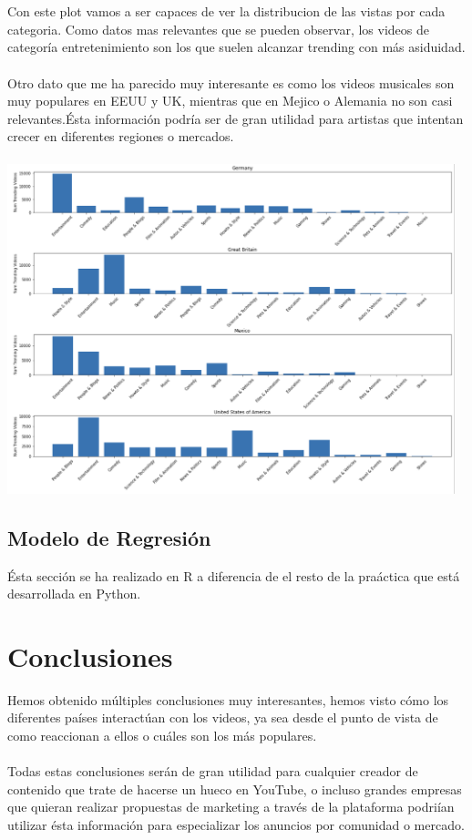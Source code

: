\documentclass[a4paper,12pt]{article}
\begin{document}
\\
\\
Con este plot vamos a ser capaces de ver la distribucion de las vistas por cada categoria. Como datos mas relevantes que se pueden observar, los videos de categor\'ia entretenimiento son los que suelen alcanzar trending con m\'as asiduidad.
\\
\\
Otro dato que me ha parecido muy interesante es como los videos musicales son muy populares en EEUU y UK, mientras que en Mejico o Alemania no son casi relevantes.\'Esta informaci\'on podr\'ia ser de gran utilidad para artistas que intentan crecer en diferentes regiones o mercados.
\\
\\
\includegraphics[width=13cm]{plot_categories.png}

\subsection{Modelo de Regresi\'on}
\'Esta secci\'on se ha realizado en R a diferencia de el resto de la pra\'actica que est\'a desarrollada en Python.



\section[item_conclusiones]{Conclusiones}
Hemos obtenido m\'ultiples conclusiones muy interesantes, hemos visto c\'omo los diferentes pa\'ises interact\'uan con los videos, ya sea desde el punto de vista de como reaccionan a ellos o cu\'ales son los m\'as populares.
\\
\\
Todas estas conclusiones ser\'an de gran utilidad para cualquier creador de contenido que trate de hacerse un hueco en YouTube, o incluso grandes empresas que quieran realizar propuestas de marketing a trav\'es de la plataforma podri\'ian utilizar \'esta informaci\'on para especializar los anuncios por comunidad o mercado.
\end{document}
